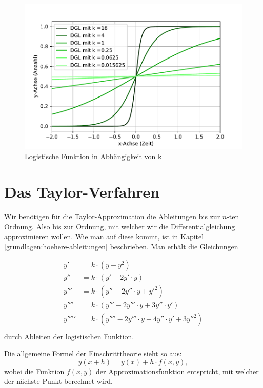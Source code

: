 \begin{figure}
	\centering
	\includegraphics[width=12cm]{papers/taylor/taylorPictures/DGLDarstellung.pdf}
	\caption{Logistische Funktion in Abhängigkeit von k}
	\label{taylor:section:fig:DGLDarstellung}
\end{figure}

\section{Das Taylor-Verfahren}
\label{taylor:subsection:Vorgehen}
Wir benötigen für die Taylor-Approximation die Ableitungen bis zur $n$-ten Ordnung.
Also bis zur Ordnung, mit welcher wir die Differentialgleichung approximieren wollen.
Wie man auf diese kommt, ist in Kapitel \ref{grundlagen:hoehere-ableitungen} beschrieben.
Man erhält die Gleichungen

\begin{equation}
\begin{aligned}
y'&=k\cdot (y-y^{2})\\
y''&=k\cdot (y'-2y'\cdot y)\\
y'''&=k\cdot (y''-2y''\cdot y+y'^{2})\\
y''''&=k\cdot (y'''-2y'''\cdot y+3y''\cdot y')\\
y'''''&=k\cdot (y''''-2y'''\cdot y+4y''\cdot y'+3y''^{2})\\
\end{aligned}
\end{equation}
durch Ableiten der logistischen Funktion.

Die allgemeine Formel der Einschritttheorie sieht so aus:
\begin{equation}
y(x+h) = y(x) + h\cdot f(x,y),
\end{equation}
wobei die Funktion $f(x,y)$ der Approximationsfunktion entspricht, mit welcher der nächste Punkt berechnet wird.

